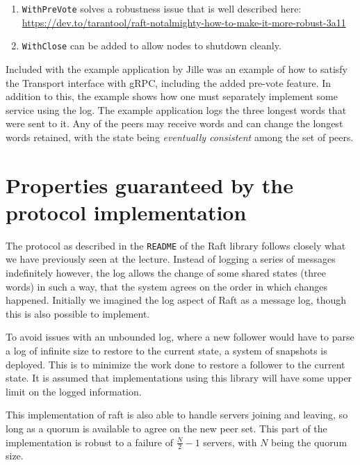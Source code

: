 \documentclass[a4paper,11pt]{article}
\begin{document}
\begin{enumerate}
    \item \texttt{WithPreVote} solves a robustness issue that is well described here: \url{https://dev.to/tarantool/raft-notalmighty-how-to-make-it-more-robust-3a11}
    \item \texttt{WithClose} can be added to allow nodes to shutdown cleanly.
\end{enumerate}

\noindent Included with the example application by Jille was an example of how to satisfy the Transport interface with gRPC, including the added pre-vote feature. In addition to this, the example shows how one must separately implement some service using the log. The example application logs the three longest words that were sent to it. Any of the peers may receive words and can change the longest words retained, with the state being \textit{eventually consistent} among the set of peers. 

\section{Properties guaranteed by the protocol implementation}

The protocol as described in the \texttt{README} of the Raft library follows closely what we have previously seen at the lecture. Instead of logging a series of messages indefinitely however, the log allows the change of some shared states (three words) in such a way, that the system agrees on the order in which changes happened. Initially we imagined the log aspect of Raft as a message log, though this is also possible to implement. 

\bigbreak \noindent To avoid issues with an unbounded log, where a new follower would have to parse a log of infinite size to restore to the current state, a system of snapshots is deployed. This is to minimize the work done to restore a follower to the current state. It is assumed that implementations using this library will have some upper limit on the logged information. 

\bigbreak \noindent This implementation of raft is also able to handle servers joining and leaving, so long as a quorum is available to agree on the new peer set. This part of the implementation is robust to a failure of $\frac{N}{2} - 1$ servers, with $N$ being the quorum size. 
\end{document}
